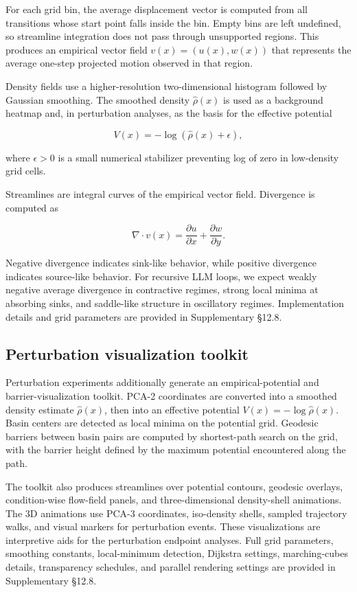 \documentclass{article}
\theoremstyle{plain}
\theoremstyle{definition}
\begin{document}
For each grid bin, the average displacement vector is computed from all transitions whose start point falls inside the bin. Empty bins are left undefined, so streamline integration does not pass through unsupported regions. This produces an empirical vector field \(v(x)=(u(x),w(x))\) that represents the average one-step projected motion observed in that region.

Density fields use a higher-resolution two-dimensional histogram followed by Gaussian smoothing. The smoothed density \(\hat\rho(x)\) is used as a background heatmap and, in perturbation analyses, as the basis for the effective potential

\[V(x)=-\log(\hat\rho(x)+\epsilon),\]

where \(\epsilon>0\) is a small numerical stabilizer preventing log of zero in low-density grid cells.

Streamlines are integral curves of the empirical vector field. Divergence is computed as

\[\nabla\cdot v(x)=\frac{\partial u}{\partial x}+\frac{\partial w}{\partial y}.\]

Negative divergence indicates sink-like behavior, while positive divergence indicates source-like behavior. For recursive LLM loops, we expect weakly negative average divergence in contractive regimes, strong local minima at absorbing sinks, and saddle-like structure in oscillatory regimes. Implementation details and grid parameters are provided in Supplementary §12.8.

\subsection{Perturbation visualization toolkit}

Perturbation experiments additionally generate an empirical-potential and barrier-visualization toolkit. PCA-2 coordinates are converted into a smoothed density estimate \(\hat\rho(x)\), then into an effective potential \(V(x)=-\log \hat\rho(x)\). Basin centers are detected as local minima on the potential grid. Geodesic barriers between basin pairs are computed by shortest-path search on the grid, with the barrier height defined by the maximum potential encountered along the path.

The toolkit also produces streamlines over potential contours, geodesic overlays, condition-wise flow-field panels, and three-dimensional density-shell animations. The 3D animations use PCA-3 coordinates, iso-density shells, sampled trajectory walks, and visual markers for perturbation events. These visualizations are interpretive aids for the perturbation endpoint analyses. Full grid parameters, smoothing constants, local-minimum detection, Dijkstra settings, marching-cubes details, transparency schedules, and parallel rendering settings are provided in Supplementary §12.8.
\end{document}
